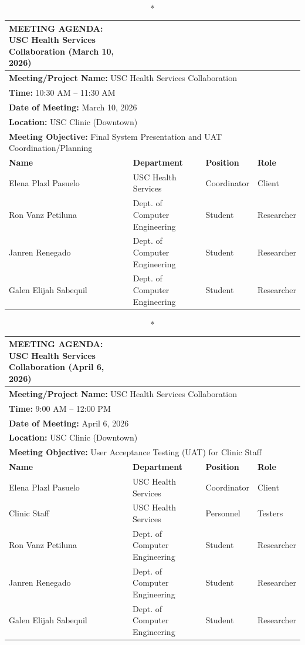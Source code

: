 \begin{longtable}{|p{4cm}|p{4cm}|p{3cm}|p{3cm}|}
\caption*{MEETING AGENDA: USC Health Services Collaboration (March 10, 2026)} \\
\hline
\multicolumn{4}{|l|}{\textbf{Meeting/Project Name:} USC Health Services Collaboration} \\
\multicolumn{4}{|l|}{\textbf{Time:} 10:30 AM – 11:30 AM} \\
\multicolumn{4}{|l|}{\textbf{Date of Meeting:} March 10, 2026} \\
\multicolumn{4}{|l|}{\textbf{Location:} USC Clinic (Downtown)} \\
\multicolumn{4}{|l|}{\textbf{Meeting Objective:} Final System Presentation and UAT Coordination/Planning} \\
\hline
\textbf{Name} & \textbf{Department} & \textbf{Position} & \textbf{Role} \\
\hline
Elena Plazl Pasuelo & USC Health Services & Coordinator & Client \\
\hline
Ron Vanz Petiluna & Dept. of Computer Engineering & Student & Researcher \\
\hline
Janren Renegado & Dept. of Computer Engineering & Student & Researcher \\
\hline
Galen Elijah Sabequil & Dept. of Computer Engineering & Student & Researcher \\
\hline
\end{longtable}

\begin{longtable}{|p{4cm}|p{4cm}|p{3cm}|p{3cm}|}
\caption*{MEETING AGENDA: USC Health Services Collaboration (April 6, 2026)} \\
\hline
\multicolumn{4}{|l|}{\textbf{Meeting/Project Name:} USC Health Services Collaboration} \\
\multicolumn{4}{|l|}{\textbf{Time:} 9:00 AM – 12:00 PM} \\
\multicolumn{4}{|l|}{\textbf{Date of Meeting:} April 6, 2026} \\
\multicolumn{4}{|l|}{\textbf{Location:} USC Clinic (Downtown)} \\
\multicolumn{4}{|l|}{\textbf{Meeting Objective:} User Acceptance Testing (UAT) for Clinic Staff} \\
\hline
\textbf{Name} & \textbf{Department} & \textbf{Position} & \textbf{Role} \\
\hline
Elena Plazl Pasuelo & USC Health Services & Coordinator & Client \\
\hline
Clinic Staff & USC Health Services & Personnel & Testers \\
\hline
Ron Vanz Petiluna & Dept. of Computer Engineering & Student & Researcher \\
\hline
Janren Renegado & Dept. of Computer Engineering & Student & Researcher \\
\hline
Galen Elijah Sabequil & Dept. of Computer Engineering & Student & Researcher \\
\hline
\end{longtable}

